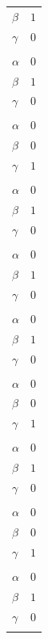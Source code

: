 \documentclass[11pt]{article}
\begin{document}
\begin{longtable}{@{}ll@{}}
$\beta$ & $1$\\
$\gamma$ & $0$\\
\addlinespace[3pt]
\multicolumn{2}{@{}l}{$\{i,j\}=\{86,105\}$, $k_{ij}=3$}\\
$\alpha$ & $0$\\
$\beta$ & $1$\\
$\gamma$ & $0$\\
\addlinespace[3pt]
\multicolumn{2}{@{}l}{$\{i,j\}=\{87,88\}$, $k_{ij}=2^{2}\cdot 3$}\\
$\alpha$ & $0$\\
$\beta$ & $0$\\
$\gamma$ & $1$\\
\addlinespace[3pt]
\multicolumn{2}{@{}l}{$\{i,j\}=\{88,90\}$, $k_{ij}=2^{2}\cdot 3$}\\
$\alpha$ & $0$\\
$\beta$ & $1$\\
$\gamma$ & $0$\\
\addlinespace[3pt]
\multicolumn{2}{@{}l}{$\{i,j\}=\{88,101\}$, $k_{ij}=2^{2}\cdot 3$}\\
$\alpha$ & $0$\\
$\beta$ & $1$\\
$\gamma$ & $0$\\
\addlinespace[3pt]
\multicolumn{2}{@{}l}{$\{i,j\}=\{90,97\}$, $k_{ij}=2$}\\
$\alpha$ & $0$\\
$\beta$ & $1$\\
$\gamma$ & $0$\\
\addlinespace[3pt]
\multicolumn{2}{@{}l}{$\{i,j\}=\{93,94\}$, $k_{ij}=3\cdot 7$}\\
$\alpha$ & $0$\\
$\beta$ & $0$\\
$\gamma$ & $1$\\
\addlinespace[3pt]
\multicolumn{2}{@{}l}{$\{i,j\}=\{94,95\}$, $k_{ij}=3\cdot 7$}\\
$\alpha$ & $0$\\
$\beta$ & $1$\\
$\gamma$ & $0$\\
\addlinespace[3pt]
\multicolumn{2}{@{}l}{$\{i,j\}=\{96,97\}$, $k_{ij}=7$}\\
$\alpha$ & $0$\\
$\beta$ & $0$\\
$\gamma$ & $1$\\
\addlinespace[3pt]
\multicolumn{2}{@{}l}{$\{i,j\}=\{97,98\}$, $k_{ij}=7$}\\
$\alpha$ & $0$\\
$\beta$ & $1$\\
$\gamma$ & $0$\\
\addlinespace[3pt]
\end{longtable}
\endgroup
\end{document}
